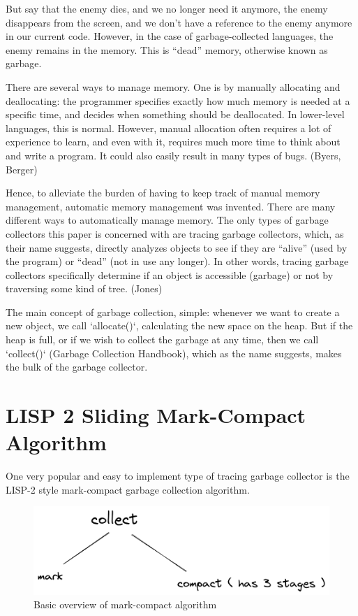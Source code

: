 \documentclass[index]{subfiles}
\begin{document}
But say that the enemy dies, and we no longer need it anymore, the enemy disappears from the screen, and we don't have a reference to the enemy anymore in our current code. However, in the case of garbage-collected languages, the enemy remains in the memory. This is ``dead'' memory, otherwise known as garbage.

There are several ways to manage memory. One is by manually allocating and deallocating: the programmer specifies exactly how much memory is needed at a specific time, and decides when something should be deallocated. In lower-level languages, this is normal. However, manual allocation often requires a lot of experience to learn, and even with it, requires much more time to think about and write a program. It could also easily result in many types of bugs. (Byers, Berger)

Hence, to alleviate the burden of having to keep track of manual memory management, automatic memory management was invented. There are many different ways to automatically manage memory. The only types of garbage collectors this paper is concerned with are tracing garbage collectors, which, as their name suggests, directly analyzes objects to see if they are ``alive'' (used by the program) or ``dead'' (not in use any longer). In other words, tracing garbage collectors specifically determine if an object is accessible (garbage) or not by traversing some kind of tree. (Jones)

The main concept of garbage collection, simple: whenever we want to create a new object, we call `allocate()`, calculating the new space on the heap. But if the heap is full, or if we wish to collect the garbage at any time, then we call `collect()` (Garbage Collection Handbook), which as the name suggests, makes the bulk of the garbage collector.

\section{LISP 2 Sliding Mark-Compact Algorithm}

One very popular and easy to implement type of tracing garbage collector is the LISP-2 style mark-compact garbage collection algorithm.

\begin{figure}[H]
    \centering
    \includegraphics[scale=0.3]{pics/mark-compact-overview.png}
    \caption{Basic overview of mark-compact algorithm}
\end{figure}
\end{document}
